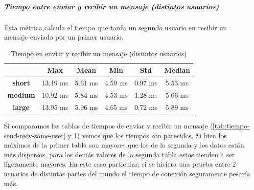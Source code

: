\subparagraph{Tiempo entre enviar y recibir un mensaje (distintos usuarios)}

Esta métrica calcula el tiempo que tarda un segundo usuario en recibir un mensaje enviado por un primer usuario.

\setlength\tabcolsep{10pt}
\begin{table}[H]
    \centering
    \begin{tabular}{|c|c|c|c|c|c|}
    \hline
    & \textbf{Max} & \textbf{Mean} & \textbf{Min} & \textbf{Std} & \textbf{Median} \\
    \hline
    \textbf{short} & 13.19 ms & 5.61 ms & 4.59 ms & 0.97 ms & 5.53 ms \\
    \hline
    \textbf{medium} & 10.92 ms & 5.84 ms & 4.53 ms & 1.28 ms & 5.06 ms \\
    \hline
    \textbf{large} & 13.95 ms & 5.96 ms & 4.65 ms & 0.72 ms & 5.89 ms \\
    \hline
    \end{tabular}
    \caption{Tiempo en enviar y recibir un mensaje (distintos usuarios)}
    \label{tab:tiempo-send-recv-diff-user}
\end{table}

Si comparamos las tablas de tiempos de enviar y recibir un mensaje (\ref{tab:tiempo-send-recv-same-user} y \ref{tab:tiempo-send-recv-diff-user}) vemos que los tiempos son parecidos. Si bien los máximos de la primer tabla son mayores que los de la segunda y los datos están más dispersos, para los demás valores de la segunda tabla estos tienden a ser ligeramente mayores. En este caso particular, si se hiciera una prueba entre 2 usuarios de distintas partes del mundo el tiempo de conexión seguramente pesaría más.
